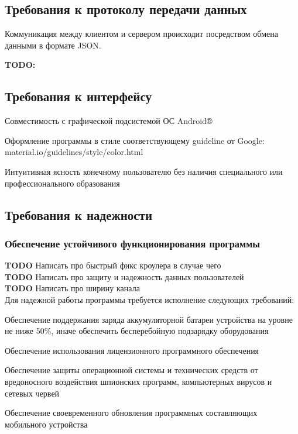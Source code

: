 \subsection{Требования к протоколу передачи данных}

Коммуникация между клиентом и сервером происходит посредством обмена данными в формате JSON.

\textbf{TODO:}
\subsection{Требования к интерфейсу}

\begin{my_enumerate}
\item Совместимость с графической подсистемой ОС Android®
\item Оформление программы в стиле соответствующему guideline от Google:\\ material.io/guidelines/style/color.html
\item Интуитивная ясность конечному пользователю без наличия специального или профессионального образования
\end{my_enumerate}

\subsection{Требования к надежности}
\subsubsection{Обеспечение устойчивого функционирования программы}
\textbf{TODO} Написать про быстрый фикс кроулера в случае чего \\
\textbf{TODO} Написать про защиту и надежность данных пользователей \\
\textbf{TODO} Написать про ширину канала \\

Для надежной работы программы требуется исполнение следующих требований:
\begin{my_enumerate}
\item Обеспечение поддержания заряда аккумуляторной батареи устройства на уровне не ниже 50\%, иначе обеспечить бесперебойную подзарядку оборудования
\item Обеспечение использования лицензионного программного обеспечения
\item Обеспечение защиты операционной системы и технических средств от вредоносного воздействия шпионских программ, компьютерных вирусов и сетевых червей
\item Обеспечение своевременного обновления программных составляющих мобильного устройства
\end{my_enumerate}


